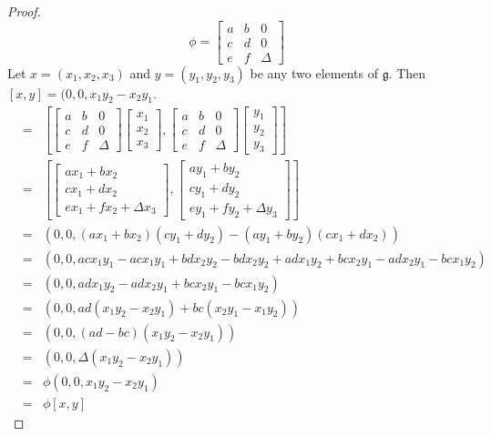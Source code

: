 \documentclass[honours]{UNSWthesis}
\newcommand{\g}{\mathfrak{g}}
\newcommand{\1}{\mathbf{e}_{1}}
\newcommand{\2}{\mathbf{e}_{3}}
\newcommand{\3}{\mathbf{e}_{3}}
\begin{document}
\begin{proof}
\[
\phi = 
\begin{bmatrix}
a & b & 0 \\
c & d & 0 \\
e & f & \Delta
\end{bmatrix}
\]
Let $x=(x_{1},x_{2},x_{3})$ and $y=(y_{1},y_{2},y_{3})$ be any two elements of $\g$. Then $[x,y]=(0,0,x_{1}y_{2}-x_{2}y_{1}$. 
\begin{eqnarray*}
[\phi(x),\phi(y)] &=& \left[
\begin{bmatrix}
a & b & 0 \\
c & d & 0 \\
e & f & \Delta
\end{bmatrix} 
\begin{bmatrix}
x_{1} \\ x_{2} \\ x_{3}
\end{bmatrix}
,
\begin{bmatrix}
a & b & 0 \\
c & d & 0 \\
e & f & \Delta
\end{bmatrix} 
\begin{bmatrix}
y_{1} \\ y_{2} \\ y_{3}
\end{bmatrix}
\right] \\
&=& \left[
\begin{bmatrix}
ax_{1}+bx_{2} \\ cx_{1}+dx_{2} \\ ex_{1}+fx_{2} + \Delta x_{3}
\end{bmatrix}
,
\begin{bmatrix}
ay_{1}+by_{2} \\ cy_{1}+dy_{2} \\ ey_{1}+fy_{2} + \Delta y_{3}
\end{bmatrix}
\right] \\
&=& (0,0,(ax_{1}+bx_{2})(cy_{1}+dy_{2})-(ay_{1}+by_{2})(cx_{1}+dx_{2})) \\
&=& (0,0,acx_{1}y_{1} - acx_{1}y_{1} + bdx_{2}y_{2} - bdx_{2}y_{2} + adx_{1}y_{2} + bcx_{2}y_{1} -adx_{2}y_{1} -bcx_{1}y_{2} ) \\
&=& (0,0, adx_{1}y_{2}  -adx_{2}y_{1}+ bcx_{2}y_{1} -bcx_{1}y_{2} ) \\
&=& (0,0,ad(x_{1}y_{2}  -x_{2}y_{1})+ bc(x_{2}y_{1} -x_{1}y_{2})) \\
&=& (0,0,(ad-bc)(x_{1}y_{2}  -x_{2}y_{1})) \\
&=& (0,0,\Delta(x_{1}y_{2}-x_{2}y_{1})) \\
&=& \phi(0,0,x_{1}y_{2}-x_{2}y_{1}) \\
&=& \phi[x,y] 
\end{eqnarray*}
\end{proof}
\end{document}
